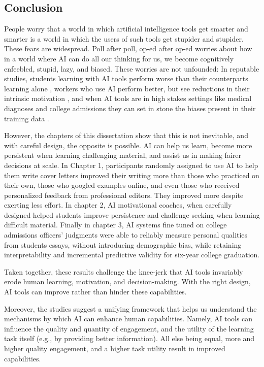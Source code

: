 \documentclass[11pt]{report}
\begin{document}
\begin{mainf}
\chapter{Conclusion}

People worry that a world in which artificial intelligence tools get smarter and smarter is a world in which the users of such tools get stupider and stupider. These fears are widespread. Poll after poll, op-ed after op-ed worries about how in a world where AI can do all our thinking for us, we become cognitively enfeebled, stupid, lazy, and biased. These worries are not unfounded: In reputable studies, students learning with AI tools perform worse than their counterparts learning alone \cite{bastani2024}, workers who use AI perform better, but see reductions in their intrinsic motivation \cite{wu2025human}, and when AI tools are in high stakes settings like medical diagnoses and college admissions they can set in stone the biases present in their training data \cite{obermeyer_dissecting_2019, alvero_essay_2021}.

However, the chapters of this dissertation show that this is not inevitable, and with careful design, the opposite is possible. AI can help us learn, become more persistent when learning challenging material, and assist us in making fairer decisions at scale. In Chapter 1, participants randomly assigned to use AI to help them write cover letters improved their writing more than those who practiced on their own, those who googled examples online, and even those who received personalized feedback from professional editors. They improved more despite exerting less effort. In chapter 2, AI motivational coaches, when carefully designed helped students improve persistence and challenge seeking when learning difficult material. Finally in chapter 3, AI systems fine tuned on college admissions officers' judgments were able to reliably measure personal qualities from students essays, without introducing demographic bias, while retaining interpretability and incremental predictive validity for six-year college graduation.

Taken together, these results challenge the knee-jerk that AI tools invariably erode human learning, motivation, and decision-making. With the right design, AI tools can improve rather than hinder these capabilities.

Moreover, the studies suggest a unifying framework that helps us understand the mechanisms by which AI can enhance human capabilities. Namely, AI tools can influence the quality and quantity of engagement, and the utility of the learning task itself (e.g., by providing better information). All else being equal, more and higher quality engagement, and a higher task utility result in improved capabilities. 


\end{mainf}
\end{document}
